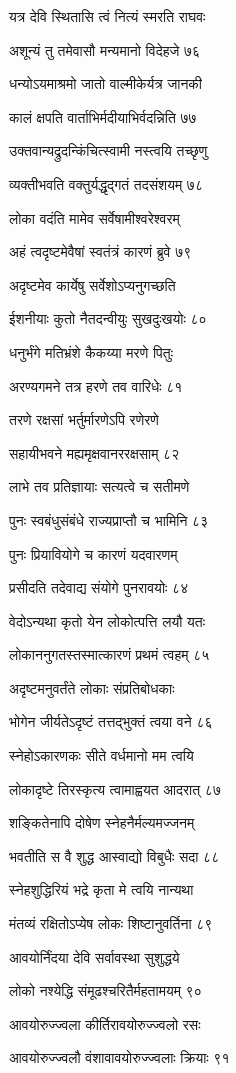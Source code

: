 यत्र देवि स्थितासि त्वं नित्यं स्मरति राघवः

अशून्यं तु तमेवासौ मन्यमानो विदेहजे ७६

धन्योऽयमाश्रमो जातो वाल्मीकेर्यत्र जानकी

कालं क्षपति वार्ताभिर्मदीयाभिर्वदन्निति ७७

उक्तवान्यद्रुदन्किंचित्स्वामी नस्त्वयि तच्छृणु

व्यक्तीभवति वक्तुर्यद्धृद्गतं तदसंशयम् ७८

लोका वदंति मामेव सर्वेषामीश्वरेश्वरम्

अहं त्वदृष्टमेवैषां स्वतंत्रं कारणं ब्रुवे ७९

अदृष्टमेव कार्येषु सर्वेशोऽप्यनुगच्छति

ईशनीयाः कुतो नैतदन्वीयुः सुखदुःखयोः ८०

धनुर्भंगे मतिभ्रंशे कैकय्या मरणे पितुः

अरण्यगमने तत्र हरणे तव वारिधेः ८१

तरणे रक्षसां भर्तुर्मारणेऽपि रणेरणे

सहायीभवने मह्यमृक्षवानररक्षसाम् ८२

लाभे तव प्रतिज्ञायाः सत्यत्वे च सतीमणे

पुनः स्वबंधुसंबंधे राज्यप्राप्तौ च भामिनि ८३

पुनः प्रियावियोगे च कारणं यदवारणम्

प्रसीदति तदेवाद्य संयोगे पुनरावयोः ८४

वेदोऽन्यथा कृतो येन लोकोत्पत्ति लयौ यतः

लोकाननुगतस्तस्मात्कारणं प्रथमं त्वहम् ८५

अदृष्टमनुवर्तंते लोकाः संप्रतिबोधकाः

भोगेन जीर्यतेऽदृष्टं तत्तद्भुक्तं त्वया वने ८६

स्नेहोऽकारणकः सीते वर्धमानो मम त्वयि

लोकादृष्टे तिरस्कृत्य त्वामाह्वयत आदरात् ८७

शङ्कितेनापि दोषेण स्नेहनैर्मल्यमज्जनम्

भवतीति स वै शुद्ध आस्वाद्यो विबुधैः सदा ८८

स्नेहशुद्धिरियं भद्रे कृता मे त्वयि नान्यथा

मंतव्यं रक्षितोऽप्येष लोकः शिष्टानुवर्तिना ८९

आवयोर्निंदया देवि सर्वावस्था सुशुद्धये

लोको नश्येद्धि संमूढश्चरितैर्महतामयम् ९०

आवयोरुज्ज्वला कीर्तिरावयोरुज्ज्वलो रसः

आवयोरुज्ज्वलौ वंशावावयोरुज्ज्वलाः क्रियाः ९१

